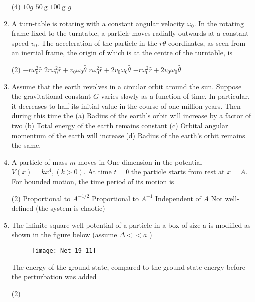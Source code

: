 \begin{enumerate}
 \begin{tasks}(4)
	\task[\textbf{a.}]$10 g$
	\task[\textbf{b.}] $50 \mathrm{~g}$
	\task[\textbf{c.}] $100 \mathrm{~g}$
	\task[\textbf{d.}]  $g$
\end{tasks}
\item  A turn-table is rotating with a constant angular velocity $\omega_{0}$. In the rotating frame fixed to the turntable, a particle moves radially outwards at a constant speed $v_{0}$. The acceleration of the particle in the $r \theta$ coordinates, as seen from an inertial frame, the origin of which is at the centre of the turntable, is
 \begin{tasks}(2)
	\task[\textbf{a.}]$-r \omega_{0}^{2} \hat{r}$
	\task[\textbf{b.}]$2 r \omega_{0}^{2} \hat{r}+v_{0} \omega_{0} \hat{\theta}$
	\task[\textbf{c.}]$r \omega_{0}^{2} \hat{r}+2 v_{0} \omega_{0} \hat{\theta}$
	\task[\textbf{d.}] $-r \omega_{0}^{2} \hat{r}+2 v_{0} \omega_{0} \hat{\theta}$
\end{tasks}
\item  Assume that the earth revolves in a circular orbit around the sun. Suppose the gravitational constant $G$ varies slowly as a function of time. In particular, it decreases to half its initial value in the course of one million years. Then during this time the
(a) Radius of the earth's orbit will increase by a factor of two
(b) Total energy of the earth remains constant
(c) Orbital angular momentum of the earth will increase
(d) Radius of the earth's orbit remains the same.
\item  A particle of mass $m$ moves in One dimension in the potential $V(x)=k x^{4},(k>0)$. At time $t=0$ the particle starts from rest at $x=A$.
For bounded motion, the time period of its motion is
 \begin{tasks}(2)
	\task[\textbf{a.}]Proportional to $A^{-1 / 2}$
	\task[\textbf{b.}]Proportional to $A^{-1}$
	\task[\textbf{c.}] Independent of $A$
	\task[\textbf{d.}]  Not well-defined (the system is chaotic)
\end{tasks}
\item  The infinite square-well potential of a particle in a box of size a is modified as shown in the figure below (assume $\Delta<<a$ )
\begin{figure}[H]
	\centering
	\texttt{[image: Net-19-11]}
	\caption{}
	\label{}
\end{figure}
The energy of the ground state, compared to the ground state energy before the perturbation was added
 \begin{tasks}(2)

\end{tasks}
\end{enumerate}
